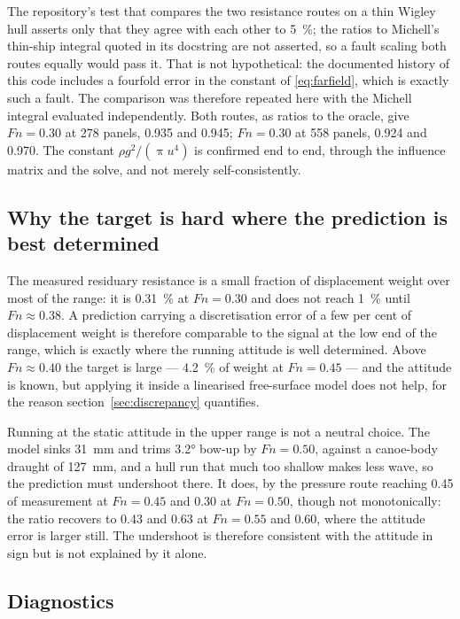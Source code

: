 \documentclass[11pt]{article}
\newcommand{\Fn}{\mathit{Fn}}
\begin{document}
The repository's test that compares the two resistance routes on a thin Wigley hull asserts
only that they agree with each other to \SI{5}{\percent}; the ratios to Michell's thin-ship
integral quoted in its docstring are not asserted, so a fault scaling both routes equally
would pass it. That is not hypothetical: the documented history of this code includes a
fourfold error in the constant of \eqref{eq:farfield}, which is exactly such a fault. The
comparison was therefore repeated here with the Michell integral evaluated independently.
Both routes, as ratios to the oracle, give $\Fn = 0.30$ at 278 panels, 0.935 and 0.945; $\Fn = 0.30$ at 558 panels, 0.924 and 0.970. The constant $\rho g^2/(\uppi u^4)$ is
confirmed end to end, through the influence matrix and the solve, and not merely
self-consistently.

\subsection{Why the target is hard where the prediction is best determined}

The measured residuary resistance is a small fraction of displacement weight over most of
the range: it is \SI{0.31}{\percent} at $\Fn = 0.30$ and does not reach
\SI{1}{\percent} until $\Fn \approx 0.38$. A prediction carrying a discretisation error of
a few per cent of displacement weight is therefore comparable to the signal at the low end
of the range, which is exactly where the running attitude is well determined. Above
$\Fn \approx 0.40$ the target is large --- \SI{4.2}{\percent} of weight at $\Fn = 0.45$ ---
and the attitude is known, but applying it inside a linearised free-surface model does not
help, for the reason section~\ref{sec:discrepancy} quantifies.

Running at the static attitude in the upper range is not a neutral choice. The model sinks
\SI{31}{\milli\metre} and trims \ang{3.2} bow-up by $\Fn = 0.50$, against a canoe-body
draught of \SI{127}{\milli\metre}, and a hull run that much too shallow makes less wave, so
the prediction must undershoot there. It does, by the pressure route reaching
\num{0.45} of measurement at $\Fn = 0.45$ and \num{0.30} at $\Fn = 0.50$, though not
monotonically: the ratio recovers to \num{0.43} and \num{0.63} at $\Fn = 0.55$ and
\num{0.60}, where the attitude error is larger still. The undershoot is therefore
consistent with the attitude in sign but is not explained by it alone.

\subsection{Diagnostics}
\end{document}
